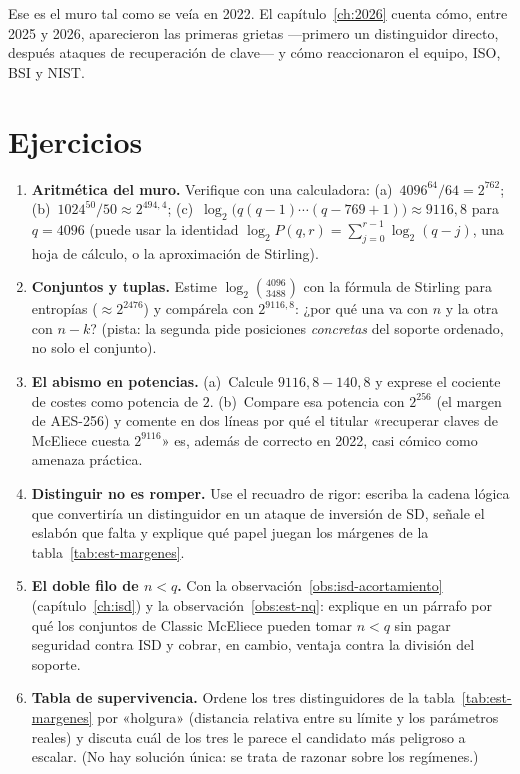 \documentclass[11pt,a4paper,oneside]{report}
\begin{document}
Ese es el muro tal como se veía en 2022. El capítulo~\ref{ch:2026}
cuenta cómo, entre 2025 y 2026, aparecieron las primeras grietas
---primero un distinguidor directo, después ataques de recuperación
de clave--- y cómo reaccionaron el equipo, ISO, BSI y NIST.

\section{Ejercicios}

\begin{enumerate}[leftmargin=1.6em,itemsep=4pt]
  \item \textbf{Aritmética del muro.} Verifique con una calculadora:
        (a)~$4096^{64}/64 = 2^{762}$; (b)~$1024^{50}/50 \approx
        2^{494{,}4}$; (c)~$\log_2\bigl(q(q-1)\cdots(q-769+1)\bigr)
        \approx 9116{,}8$ para $q=4096$ (puede usar la identidad
        $\log_2 P(q,r) = \sum_{j=0}^{r-1}\log_2(q-j)$, una hoja de
        cálculo, o la aproximación de Stirling).
  \item \textbf{Conjuntos y tuplas.} Estime $\log_2\binom{4096}{3488}$
        con la fórmula de Stirling para entropías
        ($\approx 2^{2476}$) y compárela con $2^{9116{,}8}$: ¿por qué
        una va con $n$ y la otra con $n-k$? (pista: la segunda pide
        posiciones \emph{concretas} del soporte ordenado, no solo el
        conjunto).
  \item \textbf{El abismo en potencias.} (a)~Calcule
        $9116{,}8-140{,}8$ y exprese el cociente de costes como
        potencia de $2$. (b)~Compare esa potencia con $2^{256}$
        (el margen de AES-256) y comente en dos líneas por qué el
        titular «recuperar claves de McEliece cuesta $2^{9116}$»
        es, además de correcto en 2022, casi cómico como amenaza
        práctica.
  \item \textbf{Distinguir no es romper.} Use el
        recuadro de rigor: escriba la cadena lógica que convertiría
        un distinguidor en un ataque de inversión de SD, señale el
        eslabón que falta y explique qué papel juegan los márgenes
        de la tabla~\ref{tab:est-margenes}.
  \item \textbf{El doble filo de $n<q$.} Con la
        observación~\ref{obs:isd-acortamiento} (capítulo~\ref{ch:isd})
        y la observación~\ref{obs:est-nq}: explique en un párrafo por
        qué los conjuntos de Classic McEliece pueden tomar $n<q$ sin
        pagar seguridad contra ISD y cobrar, en cambio, ventaja
        contra la división del soporte.
  \item \textbf{Tabla de supervivencia.} Ordene los tres
        distinguidores de la tabla~\ref{tab:est-margenes} por
        «holgura» (distancia relativa entre su límite y los
        parámetros reales) y discuta cuál de los tres le parece el
        candidato más peligroso a escalar. (No hay solución única:
        se trata de razonar sobre los regímenes.)
\end{enumerate}
\end{document}
